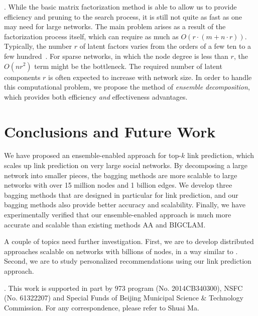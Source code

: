 \documentclass[10pt,journal,compsoc]{IEEEtran}
\newcommand{\stitle}[1]{\vspace{0.5ex}\noindent{\bf #1}}
\newcommand{\Aa}{{\sf AA}\xspace }
\newcommand{\BIGCLAM}{{\sf BIGCLAM}\xspace}
\begin{document}
\vspace{-2ex}
\stitle{Discussions}. While the basic matrix factorization method is able to allow us to provide
efficiency and pruning to the search process, it is still not quite
as fast as one may need for large networks. The main problem
arises as a result of the factorization process itself, which can
require as much as $O(r \cdot (m + n\cdot r))$.  Typically, the
number $r$ of latent factors varies from the orders of a few ten to a few hundred~\cite{NMF-nature99, NMF-www2010}. For
sparse networks, in which the node degree is less than $r$, the $O(n
r^2)$ term might be the bottleneck.  The required  number of latent
components $r$ is often expected to increase with network size. In
order to handle this computational problem, we propose the method of
{\em ensemble decomposition}, which provides both efficiency {\em
and} effectiveness advantages.









\section{Conclusions and Future Work}
We have proposed an ensemble-enabled approach for top-$k$ link prediction, which scales up link prediction on very large social
networks. By decomposing a large network into smaller pieces, the bagging methods are more scalable to large networks with over 15 million nodes and 1 billion edges. We develop three bagging methods that are designed in particular for link prediction, and our bagging methods also provide better accuracy and scalability. Finally, we have experimentally verified that our ensemble-enabled approach is much more accurate and scalable than existing methods \Aa \cite{adamic} and \BIGCLAM \cite{yang-wsdm2013}.

A couple of topics need further investigation. First, we are to develop distributed approaches scalable on networks with billions of nodes, in a way similar to \cite{NMF-www2010}.   Second, we are to study personalized recommendations using our link prediction approach.



\vspace{0.5ex}
\stitle{Acknowledgments}.
This work is supported in part by  973 program ({\small No. 2014CB340300}), NSFC ({\small No. 61322207}) and Special Funds of Beijing Municipal Science \& Technology Commission.
For any correspondence, please refer to Shuai Ma.
\end{document}
